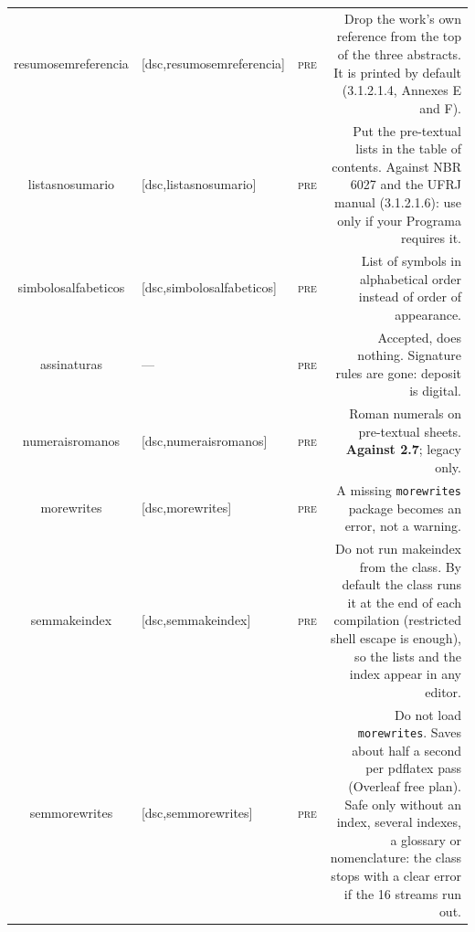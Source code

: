 \documentclass[a4paper,10pt]{article}
\newcommand\pre{\textsc{pre}}
\begin{document}
\begin{longtable}{@{}CEWD@{}}
resumosemreferencia & [dsc,resumosemreferencia] & \pre & Drop the work's own reference from the top of the three abstracts. It is printed by default (3.1.2.1.4, Annexes E and F). \\
listasnosumario & [dsc,listasnosumario] & \pre & Put the pre-textual lists in the table of contents. Against NBR 6027 and the UFRJ manual (3.1.2.1.6): use only if your Programa requires it. \\
simbolosalfabeticos & [dsc,simbolosalfabeticos] & \pre & List of symbols in alphabetical order instead of order of appearance. \\
assinaturas & ---           & \pre & Accepted, does nothing. Signature rules are gone: deposit is digital. \\
numeraisromanos & [dsc,numeraisromanos] & \pre & Roman numerals on pre-textual sheets. \textbf{Against 2.7}; legacy only. \\
morewrites & [dsc,morewrites] & \pre & A missing \texttt{morewrites} package becomes an error, not a warning. \\
semmakeindex & [dsc,semmakeindex] & \pre & Do not run makeindex from the class. By default the class runs it at the end of each compilation (restricted shell escape is enough), so the lists and the index appear in any editor. \\
semmorewrites & [dsc,semmorewrites] & \pre & Do not load \texttt{morewrites}. Saves about half a second per pdflatex pass (Overleaf free plan). Safe only without an index, several indexes, a glossary or nomenclature: the class stops with a clear error if the 16 streams run out. \\
\midrule


\end{longtable}
\end{document}
